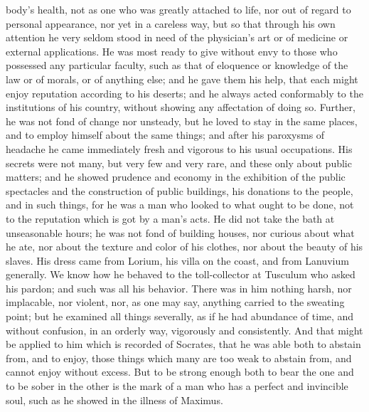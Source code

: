 \documentclass[12pt]{article}
\begin{document}
body's health, not as one who was greatly attached to life, nor out of
regard to personal appearance, nor yet in a careless way, but so that
through his own attention he very seldom stood in need of the
physician's art or of medicine or external applications. He was most
ready to give without envy to those who possessed any particular
faculty, such as that of eloquence or knowledge of the law or of morals,
or of anything else; and he gave them his help, that each might enjoy
reputation according to his deserts; and he always acted conformably to
the institutions of his country, without showing any affectation of
doing so. Further, he was not fond of change nor unsteady, but he loved
to stay in the same places, and to employ himself about the same things;
and after his paroxysms of headache he came immediately fresh and
vigorous to his usual occupations. His secrets were not many, but very
few and very rare, and these only about public matters; and he showed
prudence and economy in the exhibition of the public spectacles and the
construction of public buildings, his donations to the people, and in
such things, for he was a man who looked to what ought to be done, not
to the reputation which is got by a man's acts. He did not take the bath
at unseasonable hours; he was not fond of building houses, nor curious
about what he ate, nor about the texture and color of his clothes, nor
about the beauty of his slaves. His dress came from Lorium, his villa
on the coast, and from Lanuvium generally. We know how he behaved to
the toll-collector at Tusculum who asked his pardon; and such was all
his behavior. There was in him nothing harsh, nor implacable, nor
violent, nor, as one may say, anything carried to the sweating point;
but he examined all things severally, as if he had abundance of time,
and without confusion, in an orderly way, vigorously and consistently.
And that might be applied to him which is recorded of Socrates, that
he was able both to abstain from, and to enjoy, those things which many
are too weak to abstain from, and cannot enjoy without excess. But to be
strong enough both to bear the one and to be sober in the other is the
mark of a man who has a perfect and invincible soul, such as he showed
in the illness of Maximus.
\end{document}
